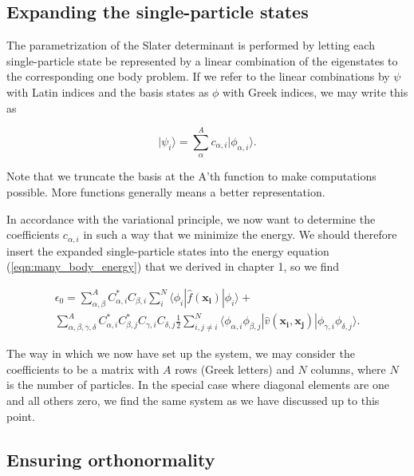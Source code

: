 \subsection{Expanding the single-particle states}

The parametrization of the Slater determinant is performed by letting each single-particle state be represented by a linear combination of the eigenstates to the corresponding one body problem. If we refer to the linear combinations by $\psi$ with Latin indices and the basis states as $\phi$ with Greek indices, we may write this as

\begin{equation}
\vert \psi_i \rangle = \sum_\alpha^A c_{\alpha,i} \vert \phi_{\alpha,i} \rangle .
\label{eqn:expanding_sp_states}
\end{equation}

Note that we truncate the basis at the A'th function to make computations possible. More functions generally means a better representation. 

In accordance with the variational principle, we now want to determine the coefficients $c_{\alpha, i}$ in such a way that we minimize the energy. We should therefore insert the expanded single-particle states into the energy equation (\ref{eqn:many_body_energy}) that we derived in chapter 1, so we find

\begin{multline}
 \epsilon _0 = \sum _{\alpha, \beta}^A C_{\alpha,i}^{*}C_{\beta,i} \sum _{i}^N \langle \phi _i | \hat{f}(\mathbf{x_i}) | \phi _i \rangle + \\ 
 \sum _{\alpha,\beta, \gamma, \delta} ^A C_{\alpha,i}^{*}C_{\beta,j}^{*}C_{\gamma,i}C_{\delta,j} \frac{1}{2}\sum _{i, j\neq i}^N \langle \phi _{\alpha,i}\phi _{\beta,j}| \hat{v}(\mathbf{x_i},\mathbf{x_j}) |\phi _{\gamma,i}\phi _{\delta,j} \rangle.
\label{eqn:greek_HF}
\end{multline}

The way in which we now have set up the system, we may consider the coefficients to be a matrix with $A$  rows (Greek letters) and $N$ columns, where $N$ is the number of particles. In the special case where diagonal elements are one and all others zero, we find the same system as we have discussed up to this point.

\subsection{Ensuring orthonormality}

